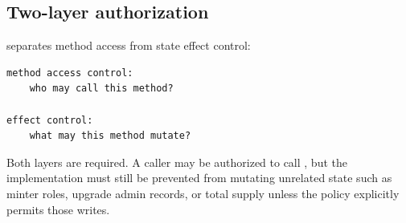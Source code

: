 


\subsection{Two-layer authorization}

\SCS{} separates method access from state effect control:

\begin{lstlisting}
method access control:
    who may call this method?

effect control:
    what may this method mutate?
\end{lstlisting}

Both layers are required. A caller may be authorized to call , but the implementation must still be prevented from mutating unrelated state such as minter roles, upgrade admin records, or total supply unless the policy explicitly permits those writes.
